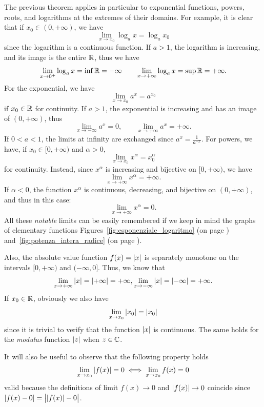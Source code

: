 The previous theorem applies in particular to exponential functions, powers,
roots, and logarithms at the extremes of their domains. For example, it is clear
that if $x_0\in (0,+\infty)$,
we have 
\[
  \lim_{x\to x_0} \log_a x = \log_a x_0
\]
since the logarithm is a continuous function. 
If $a>1$, the logarithm is increasing, and its image is the entire ${\mathbb R}$, 
thus we have 
\[
  \lim_{x\to 0^+} \log_a x = \inf {\mathbb R} = -\infty
  \qquad
  \lim_{x\to +\infty} \log_a x = \sup {\mathbb R} = +\infty.
\]
For the exponential, we have 
\[
 \lim_{x\to x_0} a^x = a^{x_0}
\]
if $x_0\in {\mathbb R}$ for continuity. 
If $a>1$, the exponential is increasing 
and has an image of $(0,+\infty)$, thus 
\[
  \lim_{x\to -\infty} a^x = 0, \qquad 
  \lim_{x\to +\infty} a^x = +\infty.
\]
If $0<a<1$, the limits at infinity 
are exchanged since $a^{x}= \frac{1}{a^{-x}}$.
For powers, we have, if $x_0\in[0,+\infty)$ and $\alpha>0$,
\[
  \lim_{x\to x_0} x^\alpha = x_0^\alpha
\]
for continuity. Instead, since $x^\alpha$ is increasing and bijective 
on $[0,+\infty)$, we have 
\[
  \lim_{x\to +\infty} x^\alpha = +\infty.
\]
If $\alpha<0$, the function $x^\alpha$ is continuous, decreasing, and bijective 
on $(0,+\infty)$, and thus in this case:
\[
  \lim_{x\to +\infty} x^\alpha = 0.
\]
All these \emph{notable} limits can be easily 
remembered if we keep in mind the graphs of elementary functions
Figures~\ref{fig:esponenziale_logaritmo} (on page
\pageref{fig:esponenziale_logaritmo})
and~\ref{fig:potenza_intera_radice} (on page
\pageref{fig:potenza_intera_radice}).

Also, the absolute value function $f(x)={\left|x\right|}$ is separately 
monotone on the intervals $[0,+\infty)$ and $(-\infty,0]$. 
Thus, we know that 
\[
  \lim_{x\to +\infty} {\left|x\right|} = {\left|+\infty\right|} = +\infty, 
  \lim_{x\to -\infty} {\left|x\right|} = {\left|-\infty\right|} = +\infty.
\]
If $x_0\in {\mathbb R}$, obviously we also have
\[
  \lim_{x\to x_0} {\left|x_0\right|} = {\left|x_0\right|}
\]
since it is trivial to verify that the function ${\left|x\right|}$ is continuous.
The same holds for the \emph{modulus} function ${\left|z\right|}$ when $z\in {\mathbb C}$.

It will also be useful to observe that the following property holds 
\[
\lim_{x\to x_0} {\left|f(x)\right|} = 0 \iff 
\lim_{x\to x_0} f(x) = 0
\]
valid because the definitions of limit $f(x)\to 0$ and ${\left|f(x)\right|}\to 0$ 
coincide since ${\left|f(x)-0\right|} = \big\lvert{{\left|f(x)\right|} - 0}\big\rvert$.

